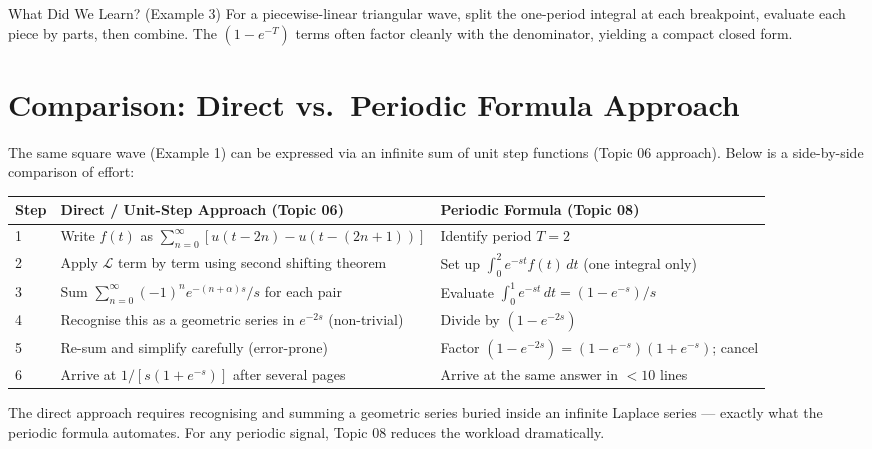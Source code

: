 \documentclass[12pt,a4paper]{article}
\begin{document}
\begin{learnbox}{What Did We Learn? (Example 3)}
For a piecewise-linear triangular wave, split the one-period integral at each
breakpoint, evaluate each piece by parts, then combine. The $(1-e^{-T})$ terms
often factor cleanly with the denominator, yielding a compact closed form.
\end{learnbox}

\section{Comparison: Direct vs.\ Periodic Formula Approach}

The same square wave (Example 1) can be expressed via an infinite sum of unit
step functions (Topic 06 approach). Below is a side-by-side comparison of
effort:

\begin{center}
\begin{tabular}{@{}lll@{}}
\toprule
\textbf{Step} & \textbf{Direct / Unit-Step Approach (Topic 06)} & \textbf{Periodic Formula (Topic 08)} \\
\midrule
1 & Write $f(t)$ as $\sum_{n=0}^{\infty}[u(t-2n) - u(t-(2n+1))]$ &
    Identify period $T=2$ \\
2 & Apply $\mathcal{L}$ term by term using second shifting theorem &
    Set up $\int_0^2 e^{-st}f(t)\,dt$ (one integral only) \\
3 & Sum $\sum_{n=0}^{\infty}(-1)^n e^{-(n+\alpha)s}/s$ for each pair &
    Evaluate $\int_0^1 e^{-st}\,dt = (1-e^{-s})/s$ \\
4 & Recognise this as a geometric series in $e^{-2s}$ (non-trivial) &
    Divide by $(1 - e^{-2s})$ \\
5 & Re-sum and simplify carefully (error-prone) &
    Factor $(1-e^{-2s}) = (1-e^{-s})(1+e^{-s})$; cancel \\
6 & Arrive at $1/[s(1+e^{-s})]$ after several pages & Arrive at the same answer in $<10$ lines \\
\bottomrule
\end{tabular}
\end{center}

\medskip
The direct approach requires recognising and summing a geometric series buried
inside an infinite Laplace series --- exactly what the periodic formula
automates. For any periodic signal, Topic 08 reduces the workload dramatically.
\end{document}
